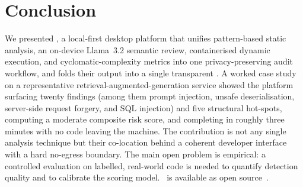 \section{Conclusion}
\label{sec:conclusion}

We presented \cs, a local-first desktop platform that unifies
pattern-based static analysis, an on-device \mbox{Llama~3.2} semantic
review, containerised dynamic execution, and cyclomatic-complexity
metrics into one privacy-preserving audit workflow, and folds their
output into a single transparent \phindex. A worked case study on a
representative retrieval-augmented-generation service showed the platform
surfacing twenty findings (among them prompt injection, unsafe
deserialisation, server-side request forgery, and SQL injection) and
five structural hot-spots, computing a moderate composite risk score, and
completing in roughly three minutes with no code leaving the machine. The
contribution is not any single analysis technique but their co-location
behind a coherent developer interface with a hard no-egress boundary. The
main open problem is empirical: a controlled evaluation on labelled,
real-world code is needed to quantify detection quality and to calibrate
the scoring model. \cs\ is available as open
source~\cite{codesentinelrepo}.

